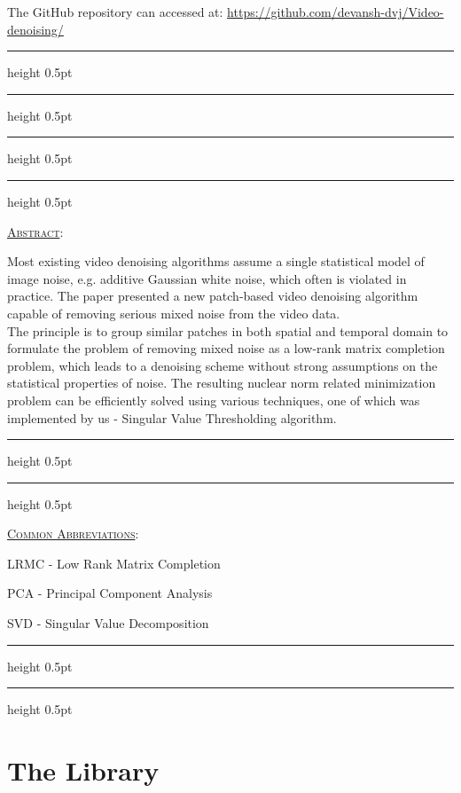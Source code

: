\documentclass[fleqn, 11pt]{article}
\newcommand{\myline}{
  \par
  \kern3pt %
  \hrule height 0.5pt
  \kern2pt %
  \hrule height 0.5pt
  \kern3pt %
  \par
}
\begin{document}
The GitHub repository can accessed at: \url{https://github.com/devansh-dvj/Video-denoising/}

\vspace{7pt}

\myline

\newpage
\vspace{-2em}
\myline

\vspace{10pt}

\underline{\large {\textsc{Abstract}}}: 

\medskip  

Most existing video denoising algorithms assume a single statistical model of image noise, e.g. additive Gaussian white noise, which often is violated in practice. The paper presented a new patch-based video denoising algorithm capable of removing serious mixed noise from the video data. \\

The principle is to group similar patches in both spatial and temporal domain to formulate the problem of removing mixed noise as a low-rank matrix completion problem, which leads to a denoising scheme without strong assumptions on the statistical properties of noise. The resulting nuclear norm related minimization problem can be efficiently solved using various techniques, one of which was implemented by us - Singular Value Thresholding algorithm.\\

\vspace{7pt}

\myline 

\vspace{10pt}

\underline{\large {\textsc{Common Abbreviations}}}: 

\medskip  

LRMC - Low Rank Matrix Completion

PCA - Principal Component Analysis

SVD - Singular Value Decomposition

\vspace{7pt}

\myline 


\newpage

\section*{The Library}
\end{document}
